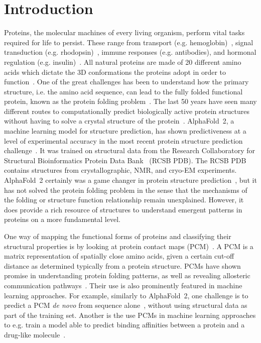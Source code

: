 \documentclass[
reprint,
twocolumn,
amsmath,amssymb,superscriptaddress,aps,
pre]{revtex4-1}
\begin{document}
\section{Introduction}
Proteins, the molecular machines of every living organism, perform vital tasks required for life to persist. These range from transport (e.g. hemoglobin)~\cite{ahmed2020hemoglobin}, signal transduction (e.g. rhodopsin)~\cite{nagata2021rhodopsins}, immune responses (e.g. antibodies), and hormonal regulation (e.g. insulin)~\cite{dill2008protein,Dill1042}. All natural proteins are made of 20 different amino acids which dictate the 3D conformations the proteins adopt in order to function~\cite{scheraga2007proteinfolding}. One of the great challenges has been to understand how the primary structure, i.e. the amino acid sequence, can lead to the fully folded functional protein, known as the protein folding problem~\cite{nassar2021protein}. The last 50 years have seen many different routes to computationally predict biologically active protein structures without having to solve a crystal structure of the protein~\cite{marks2012protein}. AlphaFold~2, a machine learning model for structure prediction, has shown predictiveness at a level of experimental accuracy in the most recent protein structure prediction challenge~\cite{jumper2021highly, kryshtafovych2021critical}. It was trained on structural data from the Research Collaboratory for Structural Bioinformatics Protein Data Bank~\cite{berman2000protein} (RCSB PDB). The RCSB PDB contains structures from crystallographic, NMR, and cryo-EM experiments. AlphaFold~2 certainly was a game changer in protein structure prediction~\cite{callaway2022what}, but it has not solved the protein folding problem in the sense that the mechanisms of the folding or structure function relationship remain unexplained. However, it does provide a rich resource of structures to understand emergent patterns in proteins on a more fundamental level. 

One way of mapping the functional forms of proteins and classifying their structural properties is by looking at protein contact maps (PCM)~\cite{Vendruscolo2002,dipaola2013protein,Estrada2011}. A PCM is a matrix representation of spatially close amino acids, given a certain cut-off distance as determined typically from a protein structure. PCMs have shown promise in understanding protein folding patterns, as well as revealing allosteric communication pathways~\cite{yao2019establishing, menichetti2016network,dokholyan2002topological}. Their use is also prominently featured in machine learning approaches. For example, similarly to AlphaFold~2, one challenge is to predict a PCM \textit{de novo} from sequence alone~\cite{bassot2019using, rives2021biological, rao2021msa}, without using structural data as part of the training set. Another is the use PCMs in machine learning approaches to e.g. train a model able to predict binding affinities between a protein and a drug-like molecule~\cite{jiang2020drug}.
\end{document}
